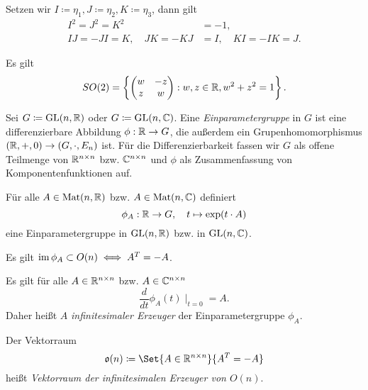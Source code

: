 \documentclass{cheat-sheet}
\newcommand{\GL}{\mathrm{GL}}
\newcommand{\Mat}{\mathrm{Mat}}
\begin{document}
\begin{defn}
  Setzen wir $I \coloneqq \eta_1, J \coloneqq \eta_2, K \coloneqq \eta_3$, dann gilt
  \begin{align*}
  I^2 = J^2 = K^2 &= -1, \\
  IJ = -JI = K, \quad JK = -KJ &= I, \quad KI = -IK = J.
  \end{align*}
\end{defn}

\begin{satz}
  Es gilt
  \[ SO(2) = \left\{ \begin{pmatrix} w & -z \\ z & w \end{pmatrix} : w, z \in \mathbb{R}, w^2 + z^2 = 1 \right\}. \]
\end{satz}


\begin{defn}
  Sei $G \coloneqq \GL(n, \R)$ oder $G \coloneqq \GL(n, \C)$. Eine \emph{Einparametergruppe} in $G$ ist eine differenzierbare Abbildung $\phi : \mathbb{R} \to G$, die außerdem ein Grupenhomomorphismus $(\mathbb{R}, +, 0) \to (G, \cdot, E_n)$ ist. Für die Differenzierbarkeit fassen wir $G$ als offene Teilmenge von $\mathbb{R}^{n \times n}$ bzw. $\mathbb{C}^{n \times n}$ und $\phi$ als Zusammenfassung von Komponentenfunktionen auf.
\end{defn}

\begin{satz}
  Für alle $A \in \Mat(n, \R)$ bzw. $A \in \Mat(n, \C)$ definiert
  \[ \phi_A : \mathbb{R} \to G, \quad t \mapsto \exp(t \cdot A) \]
  eine Einparametergruppe in $\GL(n, \R)$ bzw. in $\GL(n, \C)$.
\end{satz}

\begin{satz}
  Es gilt $\mathop{\mathrm{im}} \phi_A \subset O(n) \iff A^T = -A$.
\end{satz}

\begin{bem}
  Es gilt für alle $A \in \mathbb{R}^{n \times n}$ bzw. $A \in \mathbb{C}^{n \times n}$
  \[ \frac{d}{dt} \phi_A(t) \mid_{t=0} = A. \]
  Daher heißt $A$ \emph{infinitesimaler Erzeuger} der Einparametergruppe $\phi_A$.
\end{bem}

\begin{defn}
  Der Vektorraum
  \[ \mathfrak{o}(n) \coloneqq \Set{ A \in \R^{n \times n} }{ A^T = - A } \]
  heißt \emph{Vektorraum der infinitesimalen Erzeuger von $O(n)$}.
\end{defn}
\end{document}
